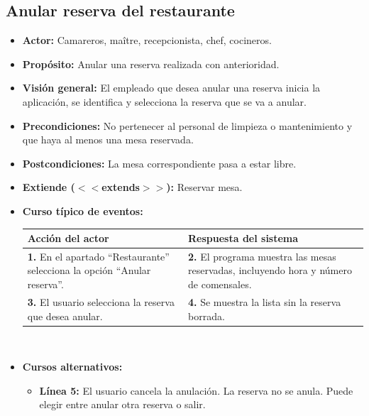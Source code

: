 \documentclass[spanish,a4paper,11pt, twoside]{report}	%
\begin{document}

		\subsection{Anular reserva del restaurante}
			\begin{itemize}
			\item \textbf{Actor:} Camareros, maître, recepcionista, chef, cocineros.
			\item \textbf{Propósito:} Anular una reserva realizada con anterioridad.
			\item \textbf{Visión general:} El empleado que desea anular una reserva inicia
							la aplicación, se identifica y selecciona la reserva que se va a anular.
			\item \textbf{Precondiciones:} No pertenecer al personal de limpieza o
							mantenimiento y que haya al menos una mesa reservada.
			\item \textbf{Postcondiciones:} La mesa correspondiente pasa a estar libre.
			\item \textbf{Extiende ($<<$extends$>>$):} Reservar mesa.
			\item \textbf{Curso típico de eventos:} 	\\
				\begin{tabular}{|p{6cm}||p{6cm}|}
				\hline
				\textbf{Acción del actor} & \textbf{Respuesta del sistema} \\ \hline \hline
				\textbf{1.} En el apartado ``Restaurante'' selecciona la opción ``Anular reserva''. & 
				\textbf{2.} El programa muestra las mesas reservadas, incluyendo hora y número de comensales. \\ \hline
				\textbf{3.} El usuario selecciona la reserva que desea anular.	& 
				\textbf{4.} Se muestra la lista sin la reserva borrada. \\ \hline
			\end{tabular}
			\\
			\item \textbf{Cursos alternativos:} 
			\begin{itemize}
				\item  \textbf{Línea 5:} El usuario cancela la anulación. La reserva no se anula.
										Puede elegir entre anular otra reserva o salir.
			\end {itemize}
		\end {itemize}
	
\end{document}
